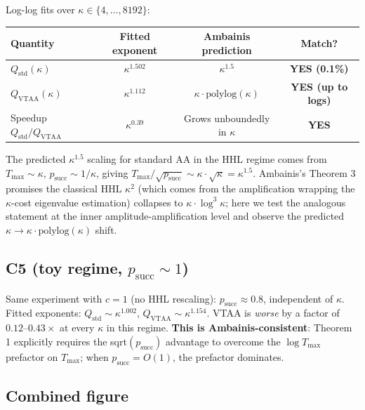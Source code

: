 \documentclass[11pt]{article}
\begin{document}
Log-log fits over $\kappa \in \{4, \ldots, 8192\}$:

\begin{center}
\begin{tabular}{l c c c}
\toprule
Quantity & Fitted exponent & Ambainis prediction & Match? \\
\midrule
$Q_{\mathrm{std}}(\kappa)$ & $\kappa^{1.502}$ & $\kappa^{1.5}$ &
\textbf{YES (0.1\%)} \\
$Q_{\mathrm{VTAA}}(\kappa)$ & $\kappa^{1.112}$ & $\kappa \cdot \mathrm{polylog}(\kappa)$ &
\textbf{YES (up to logs)} \\
Speedup $Q_{\mathrm{std}}/Q_{\mathrm{VTAA}}$ & $\kappa^{0.39}$ &
Grows unboundedly in $\kappa$ & \textbf{YES} \\
\bottomrule
\end{tabular}
\end{center}

The predicted $\kappa^{1.5}$ scaling for standard AA in the HHL regime comes
from $T_{\max} \sim \kappa$, $p_{\mathrm{succ}} \sim 1/\kappa$, giving
$T_{\max}/\sqrt{p_{\mathrm{succ}}} \sim \kappa \cdot \sqrt{\kappa} = \kappa^{1.5}$.
Ambainis's Theorem 3 promises the classical HHL $\kappa^2$ (which comes from
the amplification wrapping the $\kappa$-cost eigenvalue estimation) collapses
to $\kappa \cdot \log^3 \kappa$; here we test the analogous statement at the
inner amplitude-amplification level and observe the predicted $\kappa \to
\kappa \cdot \mathrm{polylog}(\kappa)$ shift.

\subsection{C5 (toy regime, $p_{\mathrm{succ}} \sim 1$)}

Same experiment with $c = 1$ (no HHL rescaling): $p_{\mathrm{succ}} \approx 0.8$,
independent of $\kappa$. Fitted exponents: $Q_{\mathrm{std}} \sim \kappa^{1.002}$,
$Q_{\mathrm{VTAA}} \sim \kappa^{1.154}$. VTAA is \emph{worse} by a factor of
$0.12$--$0.43\times$ at every $\kappa$ in this regime. \textbf{This is
Ambainis-consistent}: Theorem 1 explicitly requires the sqrt$(p_{\mathrm{succ}})$
advantage to overcome the $\log T_{\max}$ prefactor on $T_{\max}$; when
$p_{\mathrm{succ}} = O(1)$, the prefactor dominates.

\subsection{Combined figure}
\end{document}
